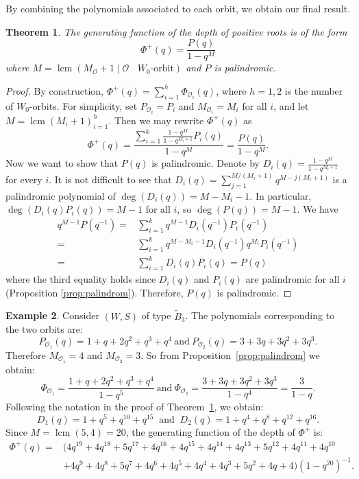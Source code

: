 \documentclass{amsart}
\newtheorem{Theorem}{Theorem}[section]
\theoremstyle{definition}
\newtheorem{Example}[Theorem]{Example}
\newcommand{\mo}{\mathcal{O}}
\begin{document}
By combining the polynomials associated to each orbit, we obtain our final result.

\def\lcm{{\operatorname{lcm}}}

\begin{Theorem}\label{th:main}
    The generating function of the depth of positive roots is of the form
    $$\Phi^+(q)=\frac{P(q)}{1-q^M}$$
    where $M=\lcm(M_\mo+1\mid \mo\ \mbox{ $W_0$-orbit})$ and $P$ is palindromic.
\end{Theorem}

\begin{proof}
    By construction, $\Phi^+(q)=\sum_{i=1}^{h}\Phi_{\mo_i}(q)$, where $h=1,2$ is the number of $W_0$-orbits. For simplicity, set $P_{\mo_i}=P_i$ and $M_{\mo_i}=M_i$ for all $i$, and let $M=\lcm(M_{i}+1)_{i=1}^h$. Then we may rewrite $\Phi^+(q)$ as $$\Phi^+(q)=\frac{\sum_{i=1}^k\frac{1-q^M}{1-q^{M_i+1}}P_i(q)}{1-q^M}=\frac{P(q)}{1-q^M}.$$
    Now we want to show that $P(q)$ is palindromic. Denote by $D_i(q)=\frac{1-q^M}{1-q^{M_i+1}}$ for every $i$. It is not difficult to see that $D_i(q)=\sum_{j=1}^{M/(M_i+1)}q^{M-j(M_i+1)}$ is a palindromic polynomial of $\deg(D_i(q))=M-M_i-1$. In particular, $\deg(D_i(q)P_i(q))=M-1$ for all $i$, so $\deg(P(q))=M-1$. We have 
    \begin{align*}  
    q^{M-1}P(q^{-1})=&\sum_{i=1}^k q^{M-1}D_i(q^{-1})P_i(q^{-1})\\
    =&\sum_{i=1}^k q^{M-M_i-1}D_i(q^{-1})q^{M_i}P_i(q^{-1})\\
    =&\sum_{i=1}^k D_i(q)P_i(q)=P(q)
    \end{align*}
    where the third equality holds since $D_i(q)$ and $P_i(q)$ are palindromic for all $i$ (Proposition \ref{prop:palindrom}). Therefore, $P(q)$ is palindromic.
\end{proof}

\begin{Example}\label{ex:poly-b3}
    Consider $(W,S)$ of type $\widetilde{B}_3$.  The polynomials corresponding to the two orbits are: 
    $$
    P_{\mo_1}(q)= 1+q+2q^2+q^3+q^4 \ \mbox{and} \  P_{\mo_2}(q)=3+3q+3q^2+3q^3.
    $$
    Therefore $M_{\mo_1}=4$ and $M_{\mo_2}=3$. So from Proposition~\ref{prop:palindrom} we obtain:
    $$
    \Phi_{\mo_1} =\frac{1+q+2q^2+q^3+q^4}{1-q^5}\ \mbox{and} \ \Phi_{\mo_2} =\frac{3+3q+3q^2+3q^3}{1-q^4}=\frac{3}{1-q}.
    $$
     Following the notation in the proof of Theorem~\ref{th:main}, we obtain:
     $$
     D_1(q)=1+q^5+q^{10}+q^{15}\ \text{ and }\ D_2(q)=1+q^4+q^8+q^{12}+q^{16}.
     $$
     Since   $M=\lcm(5,4)=20$, the generating function of the depth of $\Phi^+$ is: 
    \begin{align*}
        \Phi^+(q)=& (4q^{19} + 4q^{18} + 5q^{17} + 4q^{16} + 4q^{15} + 4q^{14} + 4q^{13} + 5q^{12} + 4q^{11} + 4q^{10}\\& + 4q^9 + 4q^8 + 5q^7 + 4q^6 + 4q^5 + 4q^4 + 4q^3 + 5q^2 + 4q + 4)(1-q^{20})^{-1}.
    \end{align*}  
\end{Example}
\end{document}
